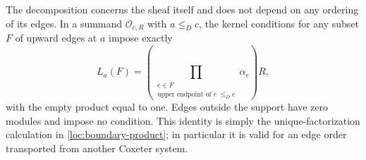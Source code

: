 \begin{remark}
\label{loc:arbitrary-edge-subsets}
The decomposition concerns the sheaf itself and does not depend on any
ordering of its edges.  In a summand $\mathcal O_{c,R}$ with $a\le_D c$,
the kernel conditions for any subset $F$ of upward edges at $a$ impose
exactly
\[
 L_a(F)=\left(
       \prod_{\substack{e\in F\\
                 \text{upper endpoint of }e\ \le_D c}}
                    \alpha_e\right)R,
\]
with the empty product equal to one.  Edges outside the support have
zero modules and impose no condition.  This identity is simply the
unique-factorization calculation in \eqref{loc:boundary-product}; in
particular it is valid for an edge order transported from another
Coxeter system.
\end{remark}
